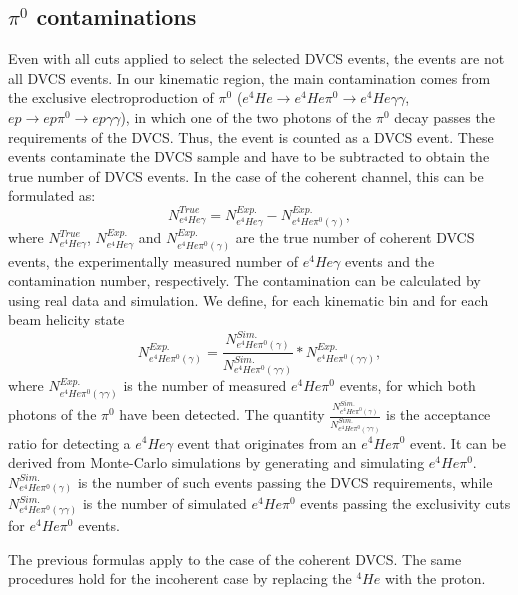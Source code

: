 \subsection{$\pi^0$ contaminations}
Even with all cuts applied to select the selected DVCS events, the events 
are not all DVCS events. In our kinematic region, the main contamination comes 
from the exclusive electroproduction of $\pi^{0}$ ($e ^{4}He \rightarrow e 
^{4}He \pi^{0} \rightarrow e ^{4}He \gamma \gamma $, $e p \rightarrow e p 
\pi^{0} \rightarrow e p \gamma \gamma $), in which one of the two photons of 
the $\pi^{0}$ decay passes the requirements of the DVCS. Thus, the event is 
counted as a DVCS event. These events contaminate the DVCS sample and have to 
be subtracted to obtain the true number of DVCS events. In the case of the 
coherent channel, this can be formulated as:
\begin{equation}
N^{True}_{e^{4}He\gamma} = N^{Exp.}_{e^{4}He\gamma} -  N^{Exp.}_{e^{4}He\pi^{0}(\gamma)},
\label{equ_back_1}
\end{equation}
where $N^{True}_{e^{4}He\gamma}$, $N^{Exp.}_{e^{4}He\gamma}$ and $ 
N^{Exp.}_{e^{4}He\pi^{0}(\gamma)}$ are the true number of coherent DVCS events, 
the experimentally measured number of $e^{4}He\gamma$ events and the 
contamination number, respectively. The contamination can be calculated by 
using real data and simulation. We define, for each kinematic bin and for each 
beam helicity state
\begin{equation}
N^{Exp.}_{e^{4}He\pi^{0}(\gamma)} = 
\frac{N^{Sim.}_{e^{4}He\pi^{0}(\gamma)}}{N^{Sim.}_{e^{4}He\pi^{0}(\gamma 
\gamma)}} * N^{Exp.}_{e^{4}He\pi^{0}(\gamma \gamma)},
\label{equation: background_equ}
\end{equation}
where $N^{Exp.}_{e^{4}He\pi^{0}(\gamma \gamma)}$ is the number of measured 
$e^{4}He\pi^{0}$ events, for which both photons of the $\pi^{0}$ have been 
detected. The quantity 
$\frac{N^{Sim.}_{e^{4}He\pi^{0}(\gamma)}}{N^{Sim.}_{e^{4}He\pi^{0}(\gamma 
\gamma)}} $ is the acceptance ratio for detecting a $e^{4}He\gamma$ event that 
originates from an $e^{4}He\pi^{0}$ event. It can be derived from Monte-Carlo 
simulations by generating and simulating $e^{4}He\pi^{0}$.  
$N^{Sim.}_{e^{4}He\pi^{0}(\gamma)}$ is the number of such events passing the 
DVCS requirements, while $N^{Sim.}_{e^{4}He\pi^{0}(\gamma \gamma)}$ is the 
number of simulated $e^{4}He\pi^{0}$ events passing the exclusivity cuts for 
$e^{4}He\pi^{0}$ events.

The previous formulas apply to the case of the coherent DVCS. The same 
procedures hold for the incoherent case by replacing the $^{4}He$ with the 
proton.

